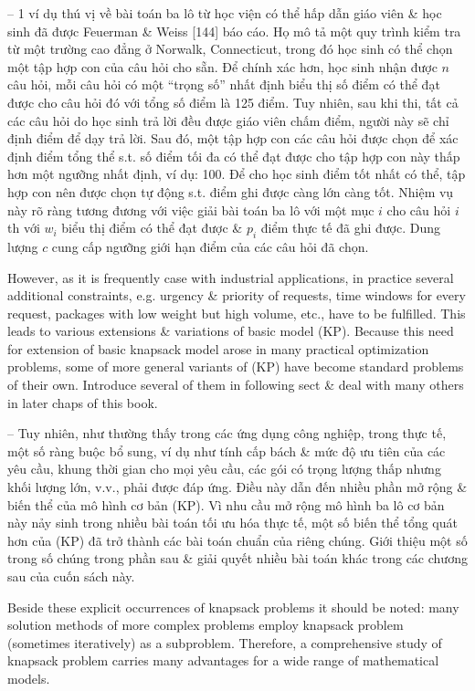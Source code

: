 \documentclass{article}
\begin{document}
\begin{itemize}
\begin{itemize}
        -- 1 ví dụ thú vị về bài toán ba lô từ học viện có thể hấp dẫn giáo viên \& học sinh đã được Feuerman \& Weiss [144] báo cáo. Họ mô tả một quy trình kiểm tra từ một trường cao đẳng ở Norwalk, Connecticut, trong đó học sinh có thể chọn một tập hợp con của câu hỏi cho sẵn. Để chính xác hơn, học sinh nhận được $n$ câu hỏi, mỗi câu hỏi có một ``trọng số'' nhất định biểu thị số điểm có thể đạt được cho câu hỏi đó với tổng số điểm là 125 điểm. Tuy nhiên, sau khi thi, tất cả các câu hỏi do học sinh trả lời đều được giáo viên chấm điểm, người này sẽ chỉ định điểm để dạy trả lời. Sau đó, một tập hợp con các câu hỏi được chọn để xác định điểm tổng thể s.t. số điểm tối đa có thể đạt được cho tập hợp con này thấp hơn một ngưỡng nhất định, ví dụ: 100. Để cho học sinh điểm tốt nhất có thể, tập hợp con nên được chọn tự động s.t. điểm ghi được càng lớn càng tốt. Nhiệm vụ này rõ ràng tương đương với việc giải bài toán ba lô với một mục $i$ cho câu hỏi $i$th với $w_i$ biểu thị điểm có thể đạt được \& $p_i$ điểm thực tế đã ghi được. Dung lượng $c$ cung cấp ngưỡng giới hạn điểm của các câu hỏi đã chọn.
        
        However, as it is frequently case with industrial applications, in practice several additional constraints, e.g. urgency \& priority of requests, time windows for every request, packages with low weight but high volume, etc., have to be fulfilled. This leads to various extensions \& variations of basic model (KP). Because this need for extension of basic knapsack model arose in many practical optimization problems, some of more general variants of (KP) have become standard problems of their own. Introduce several of them in following sect \& deal with many others in later chaps of this book.
        
        -- Tuy nhiên, như thường thấy trong các ứng dụng công nghiệp, trong thực tế, một số ràng buộc bổ sung, ví dụ như tính cấp bách \& mức độ ưu tiên của các yêu cầu, khung thời gian cho mọi yêu cầu, các gói có trọng lượng thấp nhưng khối lượng lớn, v.v., phải được đáp ứng. Điều này dẫn đến nhiều phần mở rộng \& biến thể của mô hình cơ bản (KP). Vì nhu cầu mở rộng mô hình ba lô cơ bản này nảy sinh trong nhiều bài toán tối ưu hóa thực tế, một số biến thể tổng quát hơn của (KP) đã trở thành các bài toán chuẩn của riêng chúng. Giới thiệu một số trong số chúng trong phần sau \& giải quyết nhiều bài toán khác trong các chương sau của cuốn sách này.
        
        Beside these explicit occurrences of knapsack problems it should be noted: many solution methods of more complex problems employ knapsack problem (sometimes iteratively) as a subproblem. Therefore, a comprehensive study of knapsack problem carries many advantages for a wide range of mathematical models.
        

\end{itemize}
\end{itemize}
\end{document}
